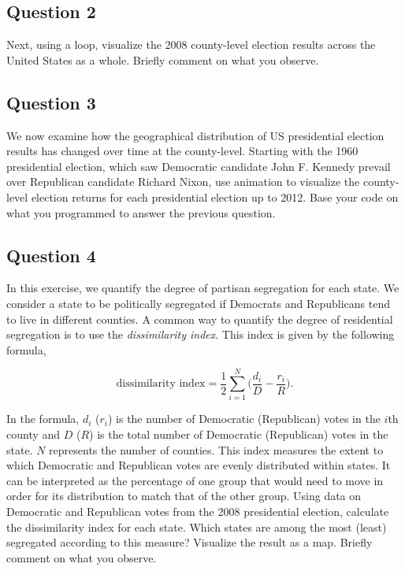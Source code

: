 \documentclass[]{article}
\begin{document}
\subsection{Question 2}\label{question-2}

Next, using a loop, visualize the 2008 county-level election results
across the United States as a whole. Briefly comment on what you
observe.

\subsection{Question 3}\label{question-3}

We now examine how the geographical distribution of US presidential
election results has changed over time at the county-level. Starting
with the 1960 presidential election, which saw Democratic candidate John
F. Kennedy prevail over Republican candidate Richard Nixon, use
animation to visualize the county-level election returns for each
presidential election up to 2012. Base your code on what you programmed
to answer the previous question.

\subsection{Question 4}\label{question-4}

In this exercise, we quantify the degree of partisan segregation for
each state. We consider a state to be politically segregated if
Democrats and Republicans tend to live in different counties. A common
way to quantify the degree of residential segregation is to use the
\emph{dissimilarity index}. This index is given by the following
formula,

\[
    \text{dissimilarity index} =  \frac{1}{2} \sum_{i=1}^N \Big(\frac{d_i}{D} - \frac{r_i}{R} \Big). 
  \]

In the formula, $d_i$ ($r_i$) is the number of Democratic (Republican)
votes in the $i$th county and $D$ ($R$) is the total number of
Democratic (Republican) votes in the state. $N$ represents the number of
counties. This index measures the extent to which Democratic and
Republican votes are evenly distributed within states. It can be
interpreted as the percentage of one group that would need to move in
order for its distribution to match that of the other group. Using data
on Democratic and Republican votes from the 2008 presidential election,
calculate the dissimilarity index for each state. Which states are among
the most (least) segregated according to this measure? Visualize the
result as a map. Briefly comment on what you observe.
\end{document}

